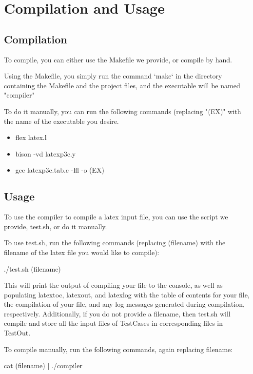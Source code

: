 
\tableofcontents
\renewcommand{\baselinestretch}{1}

\section{Compilation and Usage}

\subsection{Compilation}
To compile, you can either use the Makefile we provide, or compile by hand.

Using the Makefile, you simply run the command `make` in the directory containing the Makefile and the project files, and the executable will be named "compiler"

To do it manually, you can run the following commands (replacing "(EX)" with the name of the executable you desire.

\begin{itemize}
     \item flex latex.l
     \item bison -vd latexp3c.y
     \item gcc latexp3c.tab.c -lfl -o (EX)
\end{itemize}

\subsection{Usage}

To use the compiler to compile a latex input file, you can use the script we provide, test.sh, or do it manually.

To use test.sh, run the following commands (replacing (filename)  with the filename of the latex file you would like to compile):

./test.sh  (filename)

This will print the output of compiling your file to the console, as well as populating latextoc, latexout, and latexlog with the table of contents for your file, the compilation of your file, and any log messages generated during compilation, respectively. Additionally, if you do not provide a filename, then test.sh will compile and store all the input files of TestCases in corresponding files in TestOut. 

To compile manually, run the following commands, again replacing filename:

cat  (filename) | ./compiler

